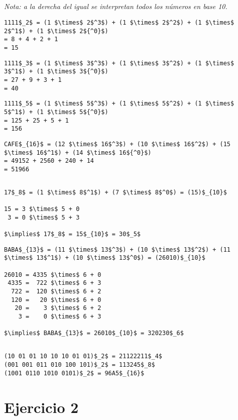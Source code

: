 \subsection{}

\emph{Nota: a la derecha del igual se interpretan todos los números en base 10.}

\begin{lstlisting}
1111$_2$ = (1 $\times$ 2$^3$) + (1 $\times$ 2$^2$) + (1 $\times$ 2$^1$) + (1 $\times$ 2${^0}$)
= 8 + 4 + 2 + 1
= 15
\end{lstlisting}

\begin{lstlisting}
1111$_3$ = (1 $\times$ 3$^3$) + (1 $\times$ 3$^2$) + (1 $\times$ 3$^1$) + (1 $\times$ 3${^0}$)
= 27 + 9 + 3 + 1
= 40
\end{lstlisting}

\begin{lstlisting}
1111$_5$ = (1 $\times$ 5$^3$) + (1 $\times$ 5$^2$) + (1 $\times$ 5$^1$) + (1 $\times$ 5${^0}$)
= 125 + 25 + 5 + 1
= 156
\end{lstlisting}

\begin{lstlisting}
CAFE$_{16}$ = (12 $\times$ 16$^3$) + (10 $\times$ 16$^2$) + (15 $\times$ 16$^1$) + (14 $\times$ 16${^0}$)
= 49152 + 2560 + 240 + 14
= 51966
\end{lstlisting}

\pagebreak
\subsection{}

\begin{lstlisting}
17$_8$ = (1 $\times$ 8$^1$) + (7 $\times$ 8$^0$) = (15)$_{10}$

15 = 3 $\times$ 5 + 0
 3 = 0 $\times$ 5 + 3

$\implies$ 17$_8$ = 15$_{10}$ = 30$_5$
\end{lstlisting}

\begin{lstlisting}
BABA$_{13}$ = (11 $\times$ 13$^3$) + (10 $\times$ 13$^2$) + (11 $\times$ 13$^1$) + (10 $\times$ 13$^0$) = (26010)$_{10}$

26010 = 4335 $\times$ 6 + 0
 4335 =  722 $\times$ 6 + 3
  722 =  120 $\times$ 6 + 2
  120 =   20 $\times$ 6 + 0
   20 =    3 $\times$ 6 + 2
    3 =    0 $\times$ 6 + 3

$\implies$ BABA$_{13}$ = 26010$_{10}$ = 320230$_6$
\end{lstlisting}

\subsection{}

\begin{lstlisting}
(10 01 01 10 10 10 01 01)$_2$ = 21122211$_4$
(001 001 011 010 100 101)$_2$ = 113245$_8$
(1001 0110 1010 0101)$_2$ = 96A5$_{16}$
\end{lstlisting}

\section{Ejercicio 2}


